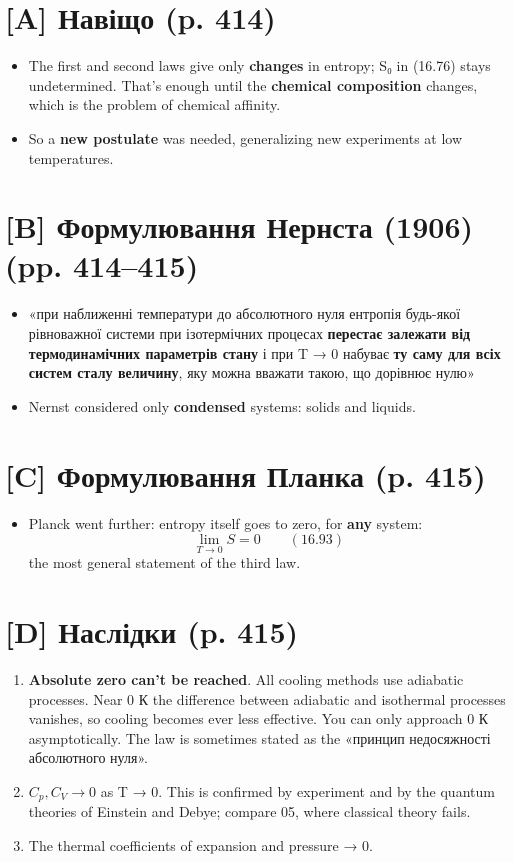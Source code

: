 \documentclass[11pt,a4paper,oneside]{book}
\begin{document}
\section*{[A] Навіщо (p. 414)}
\begin{itemize}
\item The first and second laws give only \textbf{changes} in entropy; S₀ in (16.76) stays undetermined. That's enough until the \textbf{chemical composition} changes, which is the problem of chemical affinity.
\item So a \textbf{new postulate} was needed, generalizing new experiments at low temperatures.
\end{itemize}

\section*{[B] Формулювання Нернста (1906) (pp. 414–415)}
\begin{itemize}
\item «при наближенні температури до абсолютного нуля ентропія будь-якої рівноважної системи при ізотермічних процесах \textbf{перестає залежати від термодинамічних параметрів стану} і при T → 0 набуває \textbf{ту саму для всіх систем сталу величину}, яку можна вважати такою, що дорівнює нулю»
\item Nernst considered only \textbf{condensed} systems: solids and liquids.
\end{itemize}

\section*{[C] Формулювання Планка (p. 415)}
\begin{itemize}
\item Planck went further: entropy itself goes to zero, for \textbf{any} system:
\[\lim_{T\to0}S = 0\qquad(16.93)\]
the most general statement of the third law.
\end{itemize}

\section*{[D] Наслідки (p. 415)}
\begin{enumerate}
\item \textbf{Absolute zero can't be reached}. All cooling methods use adiabatic processes. Near 0 К the difference between adiabatic and isothermal processes vanishes, so cooling becomes ever less effective. You can only approach 0 К asymptotically. The law is sometimes stated as the «принцип недосяжності абсолютного нуля».
\item $C_p, C_V \to 0$ as T → 0. This is confirmed by experiment and by the quantum theories of Einstein and Debye; compare 05, where classical theory fails.
\item The thermal coefficients of expansion and pressure → 0.
\end{enumerate}
\end{document}
